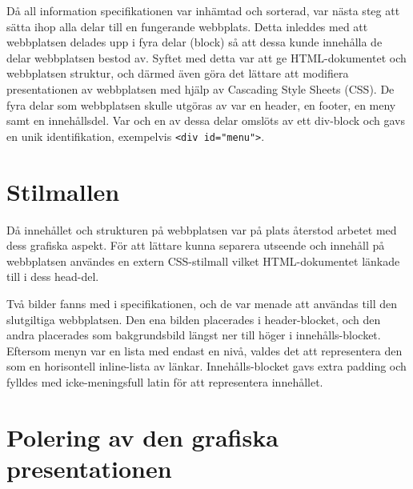 \documentclass[a4paper,10pt]{article}
\begin{document}
Då all information specifikationen var inhämtad och sorterad, var nästa steg att sätta ihop alla delar till en fungerande webbplats. Detta inleddes med att webbplatsen delades upp i fyra delar (block) så att dessa kunde innehålla de delar webbplatsen bestod av. Syftet med detta var att ge HTML-dokumentet och webbplatsen struktur, och därmed även göra det lättare att modifiera presentationen av webbplatsen med hjälp av Cascading Style Sheets (CSS). De fyra delar som webbplatsen skulle utgöras av var en header, en footer, en meny samt en innehållsdel. Var och en av dessa delar omslöts av ett div-block och gavs en unik identifikation, exempelvis \verb+<div id="menu">+.

\section{Stilmallen}

Då innehållet och strukturen på webbplatsen var på plats återstod arbetet med dess grafiska aspekt. För att lättare kunna separera utseende och innehåll på webbplatsen användes en extern CSS-stilmall vilket HTML-dokumentet länkade till i dess head-del.

Två bilder fanns med i specifikationen, och de var menade att användas till den slutgiltiga webbplatsen. Den ena bilden placerades i header-blocket, och den andra placerades som bakgrundsbild längst ner till höger i innehålls-blocket. Eftersom menyn var en lista med endast en nivå, valdes det att representera den som en horisontell inline-lista av länkar. Innehålls-blocket gavs extra padding och fylldes med icke-meningsfull latin för att representera innehållet.

\section{Polering av den grafiska presentationen}
\end{document}
